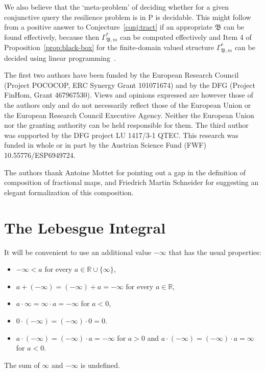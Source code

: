 \documentclass[nonacm]{acmart}
\newcommand{\bB}{{\mathfrak B}}
\begin{document}
We also believe that the `meta-problem' of deciding whether for a given conjunctive query  the resilience problem is in P is decidable. This might follow from a positive answer to Conjecture~\ref{conj:tract} if an appropriate $\bB$ can be found effectively, because then $\Gamma^*_{\bB,m}$ can be computed effectively and Item 4 of Proposition~\ref{prop:black-box} 
for the finite-domain valued structure $\Gamma^*_{\bB,m}$ can be decided using linear programming~\cite{Kolmogorov-Meta}. 



\begin{acks}
The first two authors have been funded by the European Research Council (Project POCOCOP, ERC Synergy Grant 101071674) and by the DFG (Project FinHom, Grant 467967530). Views and opinions expressed are however those of the authors only and do not necessarily reflect those of the European Union or the European Research Council Executive Agency. Neither the European Union nor the granting authority can be held responsible for them. The third author was supported by the DFG project LU 1417/3-1 QTEC. This research was funded in whole or in part by the Austrian Science Fund (FWF) 10.55776/ESP6949724.

The authors thank Antoine Mottet for pointing out a gap in the definition of composition of fractional maps, and Friedrich Martin Schneider for suggesting an elegant formalization of this  composition.
\end{acks}




\appendix
\section{The Lebesgue Integral} \label{sect:lebesgue}
It will be convenient to use an additional value $-\infty$ that has the usual properties:
\begin{itemize}
    \item $-\infty < a$ for every $a \in \mathbb{R} \cup \{\infty\}$,
    \item $a +(-\infty) = (-\infty) + a= - \infty$ for every $a \in \mathbb{R}$,
    \item $a \cdot \infty = \infty \cdot a = -\infty$ for $a<0$,
    \item $0\cdot (-\infty) = (-\infty)\cdot 0=0$.
    \item $a\cdot (-\infty)=(-\infty) \cdot a = -\infty$ for $a > 0$ and $a \cdot (-\infty)= (-\infty)\cdot a = \infty$ for $a < 0$.
\end{itemize}
The sum of $\infty$ and $-\infty$ is undefined.
\end{document}
